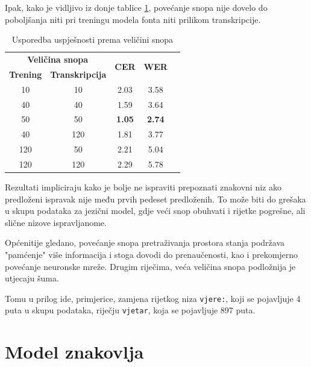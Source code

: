 \documentclass[zavrsnirad]{fer}
\begin{document}
Ipak, kako je vidljivo iz donje tablice \ref{tab:7.2}, povećanje snopa nije dovelo do poboljšanja niti pri treningu modela fonta niti prilikom transkripcije.

\bgroup
\def\arraystretch{1.25}
\begin{table}[h]
	\centering
	\begin{tabular}{|c|c|c|c|c|}
		\hline 
		\multicolumn{2}{|c|}{\textbf{Veličina snopa}} & \multicolumn{1}{|c|}{\multirow{2}{*}{\textbf{CER}}} & \multicolumn{1}{|c|}{\multirow{2}{*}{\textbf{WER}}} \\ \cline{1-2}
		
		\textbf{Trening}  & \textbf{Transkripcija}  & \multicolumn{1}{|c|}{}  & \multicolumn{1}{|c|}{}  \\ \hline
		10  & 10 &  2.03 & 3.58  \\ \hline
		40 & 40 &  1.59 & 3.64   \\ \hline
		50 & 50 &  \textbf{1.05} & \textbf{2.74}   \\ \hline
		40 & 120 & 1.81 & 3.77   \\ \hline
		120 & 50 & 2.21 & 5.04 \\ \hline        
		120 & 120 & 2.29 & 5.78 \\ \hline                                             
	\end{tabular}
	\caption{Usporedba uspješnosti prema veličini snopa}
	\label{tab:7.2}
\end{table}
\egroup

Rezultati impliciraju kako je bolje ne ispraviti prepoznati znakovni niz ako predloženi ispravak nije među prvih pedeset predloženih. To može biti do grešaka u skupu podataka za jezični model, gdje veći snop obuhvati i rijetke pogrešne, ali slične nizove ispravljanome. 

Općenitije gledano, povećanje snopa pretraživanja prostora stanja podržava "pamćenje" više informacija i stoga dovodi do prenaučenosti, kao i prekomjerno povećanje neuronske mreže. Drugim riječima, veća veličina snopa podložnija je utjecaju šuma. 

Tomu u prilog ide, primjerice, zamjena rijetkog niza \texttt{vjere:}, koji se pojavljuje 4 puta u skupu podataka, riječju \texttt{vjetar}, koja se pojavljuje 897 puta. 

\section{Model znakovlja}
\end{document}
